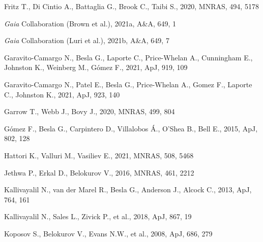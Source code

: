 \documentclass[usenatbib,fleqn]{mnras}
\newcommand{\Gaia}{\textit{Gaia}\xspace}
\begin{document}
\begin{thebibliography}{}
Fritz T., Di Cintio A., Battaglia G., Brook C., Taibi S., 2020, MNRAS, 494, 5178

\Gaia Collaboration (Brown et al.), 2021a, A\&A, 649, 1

\Gaia Collaboration (Luri et al.), 2021b, A\&A, 649, 7

Garavito-Camargo N., Besla G., Laporte C., Price-Whelan A., Cunningham E., Johnston K., Weinberg M., G{\'o}mez F., 2021, ApJ, 919, 109

Garavito-Camargo N., Patel E., Besla G., Price-Whelan A., Gomez F., Laporte C., Johnston K., 2021, ApJ, 923, 140

Garrow T., Webb J., Bovy J., 2020, MNRAS, 499, 804

G\'omez F., Besla G., Carpintero D., Villalobos \'A., O'Shea B., Bell E., 2015, ApJ, 802, 128


Hattori K., Valluri M., Vasiliev E., 2021, MNRAS, 508, 5468


Jethwa P., Erkal D., Belokurov V., 2016, MNRAS, 461, 2212

Kallivayalil N., van der Marel R., Besla G., Anderson J., Alcock C., 2013, ApJ, 764, 161

Kallivayalil N., Sales L., Zivick P., et al., 2018, ApJ, 867, 19


Koposov S., Belokurov V., Evans N.W., et al., 2008, ApJ, 686, 279


\end{thebibliography}
\end{document}
